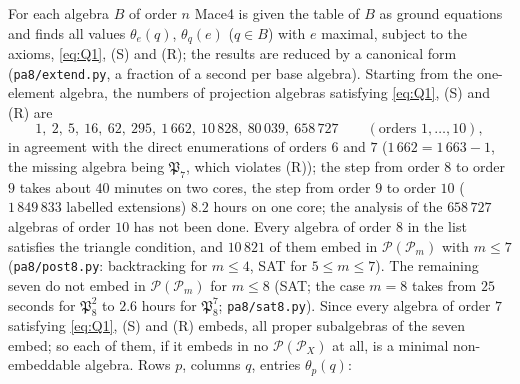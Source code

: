 \documentclass[11pt]{amsart}
\theoremstyle{definition}
\renewcommand{\P}{\mathcal{P}}
\begin{document}
For each algebra $B$ of order $n$ Mace4 is given the table of $B$ as ground equations and finds all values $\theta_e(q)$, $\theta_q(e)$ ($q\in B$) with $e$ maximal, subject to the axioms, \eqref{eq:Q1}, (S) and (R); the results are reduced by a canonical form (\texttt{pa8/extend.py}, a fraction of a second per base algebra). Starting from the one-element algebra, the numbers of projection algebras satisfying \eqref{eq:Q1}, (S) and (R) are
\[
1,\ 2,\ 5,\ 16,\ 62,\ 295,\ 1\,662,\ 10\,828,\ 80\,039,\ 658\,727\qquad(\text{orders }1,\dots,10),
\]
in agreement with the direct enumerations of orders $6$ and $7$ ($1\,662=1\,663-1$, the missing algebra being $\mathfrak P_7$, which violates (R)); the step from order $8$ to order $9$ takes about $40$ minutes on two cores, the step from order $9$ to order $10$ ($1\,849\,833$ labelled extensions) $8.2$ hours on one core; the analysis of the $658\,727$ algebras of order $10$ has not been done. Every algebra of order $8$ in the list satisfies the triangle condition, and $10\,821$ of them embed in $\P(\P_m)$ with $m\le7$ (\texttt{pa8/post8.py}: backtracking for $m\le4$, SAT for $5\le m\le7$). The remaining seven do not embed in $\P(\P_m)$ for $m\le8$ (SAT; the case $m=8$ takes from $25$ seconds for $\mathfrak P_8^2$ to $2.6$ hours for $\mathfrak P_8^7$; \texttt{pa8/sat8.py}). Since every algebra of order $7$ satisfying \eqref{eq:Q1}, (S) and (R) embeds, all proper subalgebras of the seven embed; so each of them, if it embeds in no $\P(\P_X)$ at all, is a minimal non-embeddable algebra. Rows $p$, columns $q$, entries $\theta_p(q)$:
\end{document}
